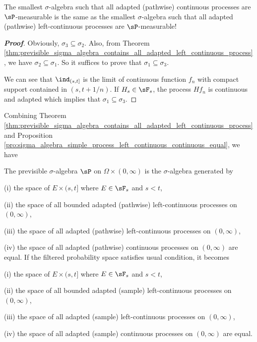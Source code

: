 \begin{remark}
The smallest $\sigma$-algebra such that all adapted (pathwise) continuous processes are $\sP$-measurable is the same as the smallest $\sigma$-algebra such that all adapted (pathwise) left-continuous processes are
$\sP$-measurable!
\end{remark}

\begin{proof}[\bf Proof]
Obviously, $\sigma_3 \subseteq \sigma_2$. Also, from Theorem \ref{thm:previsible_sigma_algebra_contains_all_adapted_left_continuous_process}, we have $\sigma_2\subseteq \sigma_1$. So it suffices to prove that $\sigma_1
\subseteq \sigma_3$.

We can see that $\ind_{(s,t]}$ is the limit of continuous function $f_n$ with compact support contained in $(s,t+1/n)$. If $H_s\in \sF_s$, the process $Hf_n$ is continuous and adapted which implies that $\sigma_1 \subseteq \sigma_3$.
\end{proof}

Combining Theorem \ref{thm:previsible_sigma_algebra_contains_all_adapted_left_continuous_process} and Proposition \ref{pro:sigma_algebra_simple_process_left_continuous_continuous_equal}, we have
\begin{proposition}
The previsible $\sigma$-algebra $\sP$ on $\Omega \times (0,\infty)$ is the $\sigma$-algebra generated by
\ben
\item [(i)] the space of $E \times(s, t]$ where $E \in \sF_s$ and $s < t$,
\item [(ii)] the space of all bounded adapted (pathwise) left-continuous processes on $(0,\infty)$,
\item [(iii)] the space of all adapted (pathwise) left-continuous processes on $(0,\infty)$,
\item [(iv)] the space of all adapted (pathwise) continuous processes on $(0,\infty)$ \een are equal. If the filtered probability space satisfies usual condition, it becomes \ben
\item [(i)] the space of $E \times(s, t]$ where $E \in \sF_s$ and $s < t$,
\item [(ii)] the space of all bounded adapted (sample) left-continuous processes on $(0,\infty)$,
\item [(iii)] the space of all adapted (sample) left-continuous processes on $(0,\infty)$,
\item [(iv)] the space of all adapted (sample) continuous processes on $(0,\infty)$ \een are equal.
\end{proposition}

